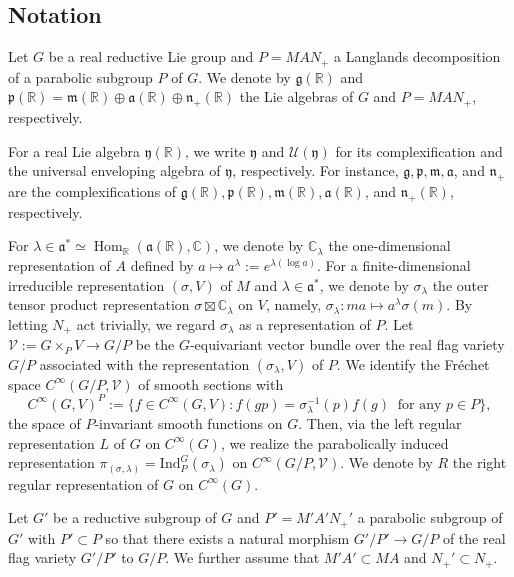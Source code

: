 \documentclass[reqno,11pt]{amsart}
\theoremstyle{remark}
\theoremstyle{definition}
\numberwithin{equation}{section}
\newcommand{\fa}{{\mathfrak a}}
\newcommand{\fg}{{\mathfrak g}}
\newcommand{\fm}{{\mathfrak m}}
\newcommand{\fn}{{\mathfrak n}}
\newcommand{\fp}{{\mathfrak p}}
\newcommand{\fy}{{\mathfrak y}}
\newcommand{\f}{\mathfrak}
\newcommand{\R}{\mathbb{R}}
\newcommand{\C}{\mathbb{C}}
\newcommand{\Cal}{\mathcal}
\newcommand{\Hom}{\operatorname{Hom}}
\newcommand{\Ind}{\mathrm{Ind}}
\begin{document}
\subsection{Notation}\label{sec:prelim}

Let $G$ be a real reductive Lie group and $P=MAN_+ $ a Langlands decomposition of a parabolic subgroup $P$ of $G$. We denote by $\fg(\R)$ and 
$\fp(\R) = \fm(\R) \oplus \fa(\R) \oplus \fn_+(\R)$ the Lie algebras of $G$ and 
$P=MAN_+$, respectively.


 For a real Lie algebra $\f{y}(\R)$, we write $\f{y}$
and $\Cal{U}(\fy)$ for its complexification and the universal enveloping algebra of 
$\fy$, respectively. 
For instance, $\fg, \fp, \fm, \fa$, and $\fn_+$ are the complexifications of $\fg(\R), \fp(\R), \fm(\R), \fa(\R)$, and $\fn_+(\R)$, 
respectively.

For $\lambda \in \fa^* \simeq \Hom_\R(\fa(\R),\C)$,
we denote by $\C_\lambda$ 
the one-dimensional representation of $A$ defined by 
$a\mapsto a^\lambda:=e^{\lambda(\log a)}$. 
For a finite-dimensional irreducible 
representation $(\sigma, V)$ of $M$ and $\lambda \in \fa^*$,
we denote by $\sigma_\lambda$ the outer tensor product representation $\sigma \boxtimes \C_\lambda$
on $V$,
namely, 
$\sigma_\lambda \colon
ma \mapsto a^\lambda\sigma(m)$. By letting $N_+$ act trivially, we regard 
$\sigma_\lambda$ as a representation of $P$. Let $\Cal{V}:=G \times_P V \to G/P$
be the $G$-equivariant vector bundle over the real flag variety $G/P$
 associated with the 
representation $(\sigma_\lambda, V)$ of $P$. We identify the Fr{\' e}chet space 
$C^\infty(G/P, \Cal{V})$ of smooth sections with 
\begin{equation*}
C^\infty(G, V)^P:=\{f \in C^\infty(G,V) : 
f(gp) = \sigma_\lambda^{-1}(p)f(g)
\;\;
\text{for any $p \in P$}\},
\end{equation*}
the space of $P$-invariant smooth functions on $G$.
Then, via the left regular representation $L$ of $G$ on $C^\infty(G)$,
we realize the parabolically induced representation 
$\pi_{(\sigma, \lambda)} = \Ind_{P}^G(\sigma_\lambda)$ on $C^\infty(G/P, \Cal{V})$.
We denote by $R$ the right regular representation of $G$ on $C^\infty(G)$.

Let $G'$ be a reductive subgroup of $G$ and $P'=M'A'N_+'$ 
a parabolic subgroup of $G'$
with $P' \subset P$
so that there exists a natural morphism $G'/P' \to G/P$
of the real flag variety $G'/P'$ to $G/P$.
We further assume that $M'A' \subset MA$ and $N_+' \subset N_+$.
\end{document}
